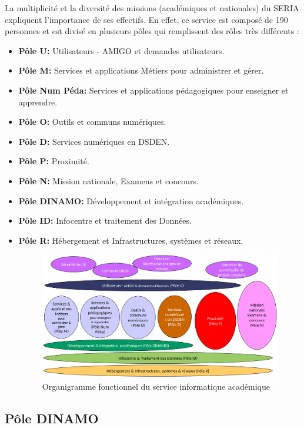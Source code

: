 \documentclass[12pt]{article}
\begin{document}
La multiplicité et la diversité des missions (académiques et nationales) du SERIA expliquent l’importance de ses effectifs. En effet, ce service est composé de 190 personnes et est divisé en plusieurs pôles qui remplissent des rôles très différents :
\begin{itemize}
\item \textbf{Pôle U: } Utilisateurs - AMIGO et demandes utilisateurs.
\item \textbf{Pôle M: } Services et applications Métiers pour administrer et gérer.
\item \textbf{Pôle Num Péda: } Services et applications pédagogiques pour enseigner et apprendre.
\item \textbf{Pôle O: } Outils et communs numériques.
\item \textbf{Pôle D: } Services numériques en DSDEN.
\item \textbf{Pôle P: } Proximité.	
\item \textbf{Pôle N: } Mission nationale, Examens et concours.
\item \textbf{Pôle DINAMO: } Développement et intégration académiques.
\item \textbf{Pôle ID: } Infocentre et traitement des Données.
\item \textbf{Pôle R: } Hébergement et Infrastructures, systèmes et réseaux.


\begin{figure}[H]
	\centering
 		\includegraphics[width=1\textwidth]{diagrammes/organigramme_DSII.png}
  		\caption{Organigramme fonctionnel du service informatique académique}
	\end{figure}

\end{itemize}

\subsection{Pôle DINAMO}
\end{document}
